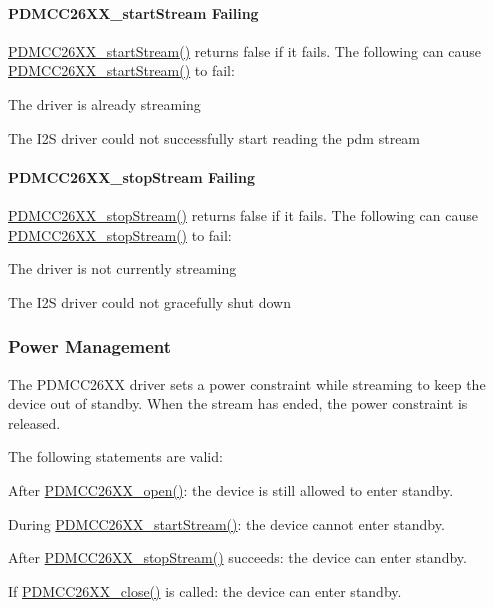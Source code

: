 \paragraph*{P\+D\+M\+C\+C26\+X\+X\+\_\+start\+Stream Failing}

\hyperlink{_p_d_m_c_c26_x_x_8h_af5fafd7c475117bd3ed6783273c2220d}{P\+D\+M\+C\+C26\+X\+X\+\_\+start\+Stream()} returns false if it fails. The following can cause \hyperlink{_p_d_m_c_c26_x_x_8h_af5fafd7c475117bd3ed6783273c2220d}{P\+D\+M\+C\+C26\+X\+X\+\_\+start\+Stream()} to fail\+:
\begin{DoxyItemize}
\item The driver is already streaming
\item The I2\+S driver could not successfully start reading the pdm stream
\end{DoxyItemize}

\paragraph*{P\+D\+M\+C\+C26\+X\+X\+\_\+stop\+Stream Failing}

\hyperlink{_p_d_m_c_c26_x_x_8h_aebd3b158f38ba1489a56efe5b9a722d2}{P\+D\+M\+C\+C26\+X\+X\+\_\+stop\+Stream()} returns false if it fails. The following can cause \hyperlink{_p_d_m_c_c26_x_x_8h_aebd3b158f38ba1489a56efe5b9a722d2}{P\+D\+M\+C\+C26\+X\+X\+\_\+stop\+Stream()} to fail\+:
\begin{DoxyItemize}
\item The driver is not currently streaming
\item The I2\+S driver could not gracefully shut down
\end{DoxyItemize}

\subsubsection*{Power Management}

The P\+D\+M\+C\+C26\+X\+X driver sets a power constraint while streaming to keep the device out of standby. When the stream has ended, the power constraint is released.

The following statements are valid\+:
\begin{DoxyItemize}
\item After \hyperlink{_p_d_m_c_c26_x_x_8h_a431d9b71e0d0eebd5ab85960f1c82ee0}{P\+D\+M\+C\+C26\+X\+X\+\_\+open()}\+: the device is still allowed to enter standby.
\item During \hyperlink{_p_d_m_c_c26_x_x_8h_af5fafd7c475117bd3ed6783273c2220d}{P\+D\+M\+C\+C26\+X\+X\+\_\+start\+Stream()}\+: the device cannot enter standby.
\item After \hyperlink{_p_d_m_c_c26_x_x_8h_aebd3b158f38ba1489a56efe5b9a722d2}{P\+D\+M\+C\+C26\+X\+X\+\_\+stop\+Stream()} succeeds\+: the device can enter standby.
\item If \hyperlink{_p_d_m_c_c26_x_x_8h_afb9597d25d6b2e02f6903bf6652d4371}{P\+D\+M\+C\+C26\+X\+X\+\_\+close()} is called\+: the device can enter standby.
\end{DoxyItemize}

